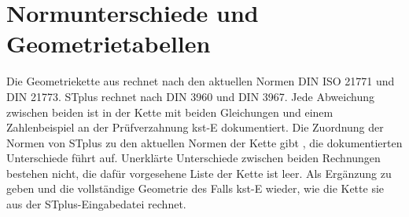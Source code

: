 \section{Normunterschiede und Geometrietabellen}
\label{sec:anhang_b}

Die Geometriekette aus  rechnet nach den aktuellen Normen DIN ISO 21771 und DIN 21773. STplus rechnet nach DIN 3960 \cite{DIN3960} und DIN 3967. Jede Abweichung zwischen beiden ist in der Kette mit beiden Gleichungen und einem Zahlenbeispiel an der Prüfverzahnung kst-E dokumentiert. Die Zuordnung der Normen von STplus zu den aktuellen Normen der Kette gibt , die dokumentierten Unterschiede führt  auf. Unerklärte Unterschiede zwischen beiden Rechnungen bestehen nicht, die dafür vorgesehene Liste der Kette ist leer. Als Ergänzung zu  geben  und  die vollständige Geometrie des Falls kst-E wieder, wie die Kette sie aus der STplus-Eingabedatei rechnet.






